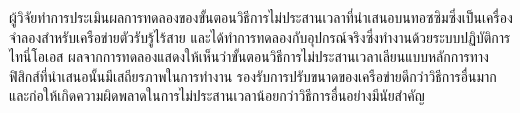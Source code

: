 \begin{thaiabstract}
ผู้{\wbr}วิจัย{\wbr}ทำ{\wbr}การ{\wbr}ประเมิน{\wbr}ผล{\wbr}การ{\wbr}ทดลอง{\wbr}ของ{\wbr}ขั้นตอนวิธี{\wbr}การ{\wbr}ไม่ประสาน{\wbr}เวลา{\wbr}ที่{\wbr}นำเสนอ{\wbr}บน{\wbr}ทอ{\wbr}ซ{\wbr}ซิ{\wbr}ม{\wbr}ซึ่ง{\wbr}เป็น{\wbr}เครื่อง{\wbr}จำลอง{\wbr}สำหรับ{\wbr}เครือข่าย{\wbr}ตัวรับ{\wbr}รู้{\wbr}ไร้{\wbr}สาย{\wbr}
และ{\wbr}ได้{\wbr}ทำการ{\wbr}ทดลอง{\wbr}กับ{\wbr}อุปกรณ์{\wbr}จริง{\wbr}ซึ่ง{\wbr}ทำงาน{\wbr}ด้วย{\wbr}ระบบปฏิบัติการ{\wbr}ไท{\wbr}นี่{\wbr}โอเอ{\wbr}ส ผล{\wbr}จาก{\wbr}การ{\wbr}ทดลอง{\wbr}แสดง{\wbr}ให้{\wbr}เห็น{\wbr}ว่า{\wbr}ขั้นตอนวิธี{\wbr}การ{\wbr}ไม่{\wbr}ประสาน{\wbr}เวลา{\wbr}เลียน{\wbr}แบบ{\wbr}หลักการ{\wbr}ทาง{\wbr}ฟิสิกส์{\wbr}ที่{\wbr}นำเสนอ{\wbr}นั้น{\wbr}มี{\wbr}เสถียรภาพ{\wbr}ใน{\wbr}การ{\wbr}ทำงาน รองรับ{\wbr}การ{\wbr}ปรับ{\wbr}ขนาด{\wbr}ของ{\wbr}เครือข่าย{\wbr}ดี{\wbr}กว่า{\wbr}วิธีการ{\wbr}อื่น{\wbr}มาก และ{\wbr}ก่อ{\wbr}ให้{\wbr}เกิด{\wbr}ความผิด{\wbr}พลาด{\wbr}ใน{\wbr}การ{\wbr}ไม่{\wbr}ประสาน{\wbr}เวลา{\wbr}น้อย{\wbr}กว่า{\wbr}วิธีการ{\wbr}อื่น{\wbr}อย่าง{\wbr}มี{\wbr}นัยสำคัญ 
\end{thaiabstract}
